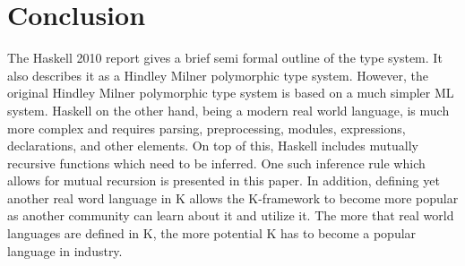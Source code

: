 \chapter{Conclusion}

The Haskell 2010 report gives a brief semi formal outline of the type system. It also describes it as a Hindley Milner polymorphic type system. However, the original Hindley Milner polymorphic type system is based on a much simpler ML system. Haskell on the other hand, being a modern real world language, is much more complex and requires parsing, preprocessing, modules, expressions, declarations, and other elements. On top of this, Haskell includes mutually recursive functions which need to be inferred. One such inference rule which allows for mutual recursion is presented in this paper. In addition, defining yet another real word language in K allows the K-framework to become more popular as another community can learn about it and utilize it. The more that real world languages are defined in K, the more potential K has to become a popular language in industry.